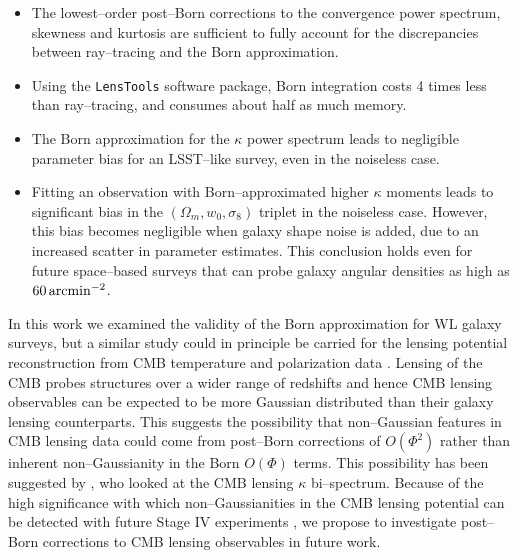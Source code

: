 \documentclass[reprint,aps,prd,superscriptaddress,showkeys,showpacs]{revtex4-1}
\newcommand{\ttt}[1]{\texttt{#1}}
\begin{document}
\begin{itemize}
\item The lowest--order post--Born corrections to the convergence power spectrum, skewness and kurtosis are sufficient to fully account for the discrepancies between ray--tracing and the Born approximation.
\item Using the \ttt{LensTools} software package, Born integration costs 4 times less than ray--tracing, and consumes about half as much memory.
\item The Born approximation for the $\kappa$ power spectrum leads to negligible parameter bias for an LSST--like survey, even in the noiseless case.
\item Fitting an observation with Born--approximated higher $\kappa$ moments leads to significant bias in the $(\Omega_m,w_0,\sigma_8)$ triplet in the noiseless case. However, this bias becomes negligible when galaxy shape noise is added, due to an increased scatter in parameter estimates. This conclusion holds even for future space--based surveys that can probe galaxy angular densities as high as $60\,{\rm arcmin}^{-2}$.    
\end{itemize}
%
In this work we examined the validity of the Born approximation for WL galaxy surveys, but a similar study could in principle be carried for the lensing potential reconstruction from CMB temperature and polarization data \citep{CMBCalabrese}. Lensing of the CMB probes structures over a wider range of redshifts and hence CMB lensing observables can be expected to be more Gaussian distributed than their galaxy lensing counterparts. This suggests the possibility that non--Gaussian features in CMB lensing data could come from post--Born corrections of $O(\Phi^2)$ rather than inherent non--Gaussianity in the Born $O(\Phi)$ terms. This possibility has been suggested by \citep{CMBPrattenLewis}, who looked at the CMB lensing $\kappa$ bi--spectrum. Because of the high significance with which non--Gaussianities in the CMB lensing potential can be detected with future Stage IV experiments \citep{CMBLNG}, we propose to investigate post--Born corrections to CMB lensing observables in future work.  

\end{document}
